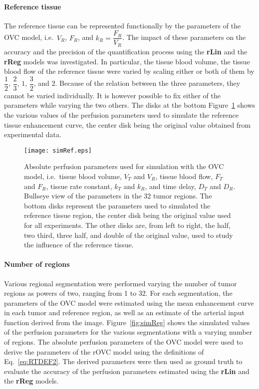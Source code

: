 \paragraph{Reference tissue}
The reference tissue can be represented functionally by the parameters of the OVC model, i.e.~$V_R$, $F_R$, and $k_R = \dfrac{F_R}{V_R}$.
The impact of these parameters on the accuracy and the precision of the quantification process using the \textbf{rLin} and the \textbf{rReg} models was investigated.
In particular, the tissue blood volume, the tissue blood flow of the reference tissue were varied by scaling either or both of them by $\dfrac{1}{2}$, $\dfrac{2}{3}$, $1$, $\dfrac{3}{2}$, and $2$.
Because of the relation between the three parameters, they cannot be varied individually.
It is however possible to fix either of the parameters while varying the two others.
The disks at the bottom Figure~\ref{fig:simRef} shows the various values of the perfusion parameters used to simulate the reference tissue enhancement curve, the center disk being the original value obtained from experimental data.

\begin{figure}
\texttt{[image: simRef.eps]}
\caption{Absolute perfusion parameters used for simulation with the OVC model, i.e.~tissue blood volume, $V_T$ and $V_R$, tissue blood flow, $F_T$ and $F_R$, tissue rate constant, $k_T$ and $k_R$, and time delay, $D_T$ and $D_R$. Bullseye view of the parameters in the 32 tumor regions. The bottom disks represent the parameters used to simulated the reference tissue region, the center disk being the original value used for all experiments. The other disks are, from left to right, the half, two third, three half, and double of the original value, used to study the influence of the reference tissue.}
\label{fig:simRef}
\end{figure}

\paragraph{Number of regions}
Various regional segmentation were performed varying the number of tumor regions as powers of two, ranging from 1 to 32.
For each segmentation, the parameters of the OVC model were estimated using the mean enhancement curve in each tumor and reference region, as well as an estimate of the arterial input function derived from the image. 
Figure~\ref{fig:simReg} shows the simulated values of the perfusion parameters for the various segmentations with a varying number of regions. 
The absolute perfusion parameters of the OVC model were used to derive the parameters of the rOVC model using the definitions of Eq.~\ref{eq:RTDEF2}.
The derived parameters were then used as ground truth to evaluate the accuracy of the perfusion parameters estimated using the \textbf{rLin} and the \textbf{rReg} models.

